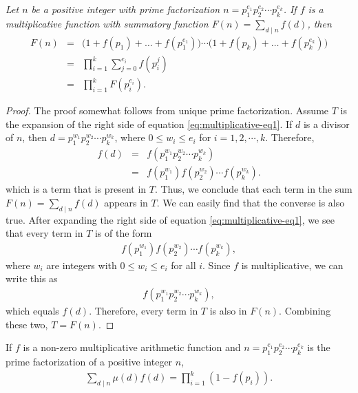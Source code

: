 \documentclass[12pt]{subfile}
\begin{document}
		\begin{theorem}\slshape\label{thm:sumfunction}
			Let $n$ be a positive integer with prime factorization $n=p_1^{e_1}p_2^{e_2} \cdots p_k^{e_k}$. If $f$ is a multiplicative function with summatory function $F(n)=\sum\limits_{d\mid n}f(d)$, then
				\begin{eqnarray}
					F(n)
					& = &
					\Big(1+f(p_1)+\ldots+f\left(p_1^{e_1}\right)\Big)\cdots\Big(1+f(p_k)+\ldots+f\left(p_k^{e_k}\right)\Big) \label{eq:multiplicative-eq1}\\
					& = &
					\prod_{i=1}^k\sum_{j=0}^{e_i}f\left(p_i^j\right) \nonumber\\
					& = & \prod_{i=1}^kF\left(p_i^{e_i}\right).\nonumber
				\end{eqnarray}
		\end{theorem}

		\begin{proof}
			The proof somewhat follows from unique prime factorization. Assume $T$ is the expansion of the right side of equation \ref{eq:multiplicative-eq1}.
			If $d$ is a divisor of $n$, then $d=p_1^{w_1}p_2^{w_2}\cdots p_k^{w_k}$, where $0\leq w_i\leq e_i$ for $i=1,2,\cdots,k$. Therefore,
				\begin{eqnarray*}
					f(d)    & = & f\left(p_1^{w_1}p_2^{w_2}\cdots p_k^{w_k}\right)\\
							& = & f\left(p_1^{w_1}\right) f\left(p_2^{w_2}\right)\cdots f\left(p_k^{w_k}\right).
				\end{eqnarray*}
			which is a term that is present in $T$. Thus, we conclude that each term in the sum $F(n)=\sum\limits_{d\mid n}f(d)$ appears in $T$. We can easily find that the converse is also true. After expanding the right side of equation \ref{eq:multiplicative-eq1}, we see that every term in $T$ is of the form
				\begin{align*}
					f\left(p_1^{w_1}\right)	f\left(p_2^{w_2}\right)\cdots f\left(p_k^{w_k}\right),
				\end{align*}
			where $w_i$ are integers with $0 \leq w_i \leq e_i$ for all $i$. Since $f$ is multiplicative, we can write this as
				\begin{align*}
					f\left(p_1^{w_1}p_2^{w_2}\cdots p_k^{w_k}\right),
				\end{align*}
			which equals $f(d)$. Therefore, every term in $T$ is also in $F(n)$. Combining these two, $T=F(n)$.
		\end{proof}



		\begin{corollary}
			If $f$ is a non-zero multiplicative arithmetic function and $n=p_1^{e_1}p_2^{e_2} \cdots p_k^{e_k}$ is the prime factorization of a positive integer $n$,
				\begin{align*}
					\sum\limits_{d\mid n}\mu(d)f(d) = \prod_{i=1}^{k} (1-f(p_i)).
				\end{align*}
		\end{corollary}
\end{document}
